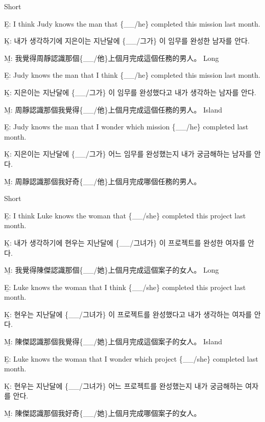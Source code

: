 \pex %
\a Short\par\nobreak
\beginsubsub
\b{E:} I think Judy knows the man that \{\_\_/he\} completed this mission last month.\par\nobreak
\b{K:} \ko 내가 생각하기에 지은이는 지난달에 \{\_\_/그가\} 이 임무를 완성한 남자를 안다. \normalfont\par\nobreak
\b{M:} \zh 我覺得周靜認識那個\{\_\_/他\}上個月完成這個任務的男人。 \normalfont
\endsubsub
\a Long\par\nobreak
\beginsubsub
\b{E:} Judy knows the man that I think \{\_\_/he\} completed this mission last month.\par\nobreak
\b{K:} \ko 지은이는 지난달에 \{\_\_/그가\} 이 임무를 완성했다고 내가 생각하는 남자를 안다. \normalfont\par\nobreak
\b{M:} \zh 周靜認識那個我覺得\{\_\_/他\}上個月完成這個任務的男人。 \normalfont
\endsubsub
\a Island\par\nobreak
\beginsubsub
\b{E:} Judy knows the man that I wonder which mission \{\_\_/he\} completed last month.\par\nobreak
\b{K:} \ko 지은이는 지난달에 \{\_\_/그가\} 어느 임무를 완성했는지 내가 궁금해하는 남자를 안다\normalfont.\par\nobreak
\b{M:} \zh 周靜認識那個我好奇\{\_\_/他\}上個月完成哪個任務的男人。\normalfont
\endsubsub
\xe

\pex %
\a Short\par\nobreak
\beginsubsub
\b{E:} I think Luke knows the woman that \{\_\_/she\} completed this project last month.\par\nobreak
\b{K:} \ko 내가 생각하기에 현우는 지난달에 \{\_\_/그녀가\} 이 프로젝트를 완성한 여자를 안다. \normalfont\par\nobreak
\b{M:} \zh 我覺得陳傑認識那個\{\_\_/她\}上個月完成這個案子的女人。 \normalfont
\endsubsub
\a Long\par\nobreak
\beginsubsub
\b{E:} Luke knows the woman that I think \{\_\_/she\} completed this project last month.\par\nobreak
\b{K:} \ko 현우는 지난달에 \{\_\_/그녀가\} 이 프로젝트를 완성했다고 내가 생각하는 여자를 안다. \normalfont\par\nobreak
\b{M:} \zh 陳傑認識那個我覺得\{\_\_/她\}上個月完成這個案子的女人。 \normalfont
\endsubsub
\a Island\par\nobreak
\beginsubsub
\b{E:} Luke knows the woman that I wonder which project \{\_\_/she\} completed last month.\par\nobreak
\b{K:} \ko 현우는 지난달에 \{\_\_/그녀가\} 어느 프로젝트를 완성했는지 내가 궁금해하는 여자를 안다\normalfont.\par\nobreak
\b{M:} \zh 陳傑認識那個我好奇\{\_\_/她\}上個月完成哪個案子的女人。\normalfont
\endsubsub
\xe

